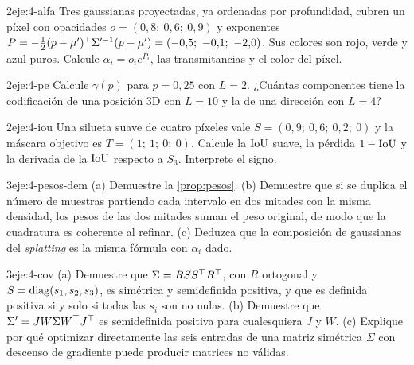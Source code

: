 \begin{ejercicio}{2}{eje:4-alfa}
Tres gaussianas proyectadas, ya ordenadas por profundidad, cubren un píxel con opacidades $o=(0{,}8;\ 0{,}6;\ 0{,}9)$ y exponentes $P=-\tfrac12(p-\mu')^\T\Sigma'^{-1}(p-\mu')=(-0{,}5;\ -0{,}1;\ -2{,}0)$. Sus colores son rojo, verde y azul puros. Calcule $\alpha_i=o_ie^{P_i}$, las transmitancias y el color del píxel.
\end{ejercicio}

\begin{ejercicio}{2}{eje:4-pe}
Calcule $\gamma(p)$ para $p=0{,}25$ con $L=2$. ¿Cuántas componentes tiene la codificación de una posición 3D con $L=10$ y la de una dirección con $L=4$?
\end{ejercicio}

\begin{ejercicio}{2}{eje:4-iou}
Una silueta suave de cuatro píxeles vale $S=(0{,}9;\ 0{,}6;\ 0{,}2;\ 0)$ y la máscara objetivo es $T=(1;\ 1;\ 0;\ 0)$. Calcule la $\operatorname{IoU}$ suave, la pérdida $1-\operatorname{IoU}$ y la derivada de la $\operatorname{IoU}$ respecto a $S_3$. Interprete el signo.
\end{ejercicio}

\begin{ejercicio}{3}{eje:4-pesos-dem}
(a) Demuestre la \cref{prop:pesos}. (b) Demuestre que si se duplica el número de muestras partiendo cada intervalo en dos mitades con la misma densidad, los pesos de las dos mitades suman el peso original, de modo que la cuadratura es coherente al refinar. (c) Deduzca que la composición de gaussianas del \emph{splatting} es la misma fórmula con $\alpha_i$ dado.
\end{ejercicio}

\begin{ejercicio}{3}{eje:4-cov}
(a) Demuestre que $\Sigma=RSS^\top R^\top$, con $R$ ortogonal y $S=\operatorname{diag}(s_1,s_2,s_3)$, es simétrica y semidefinida positiva, y que es definida positiva si y solo si todas las $s_i$ son no nulas. (b) Demuestre que $\Sigma'=JW\Sigma W^\top J^\top$ es semidefinida positiva para cualesquiera $J$ y $W$. (c) Explique por qué optimizar directamente las seis entradas de una matriz simétrica $\Sigma$ con descenso de gradiente puede producir matrices no válidas.
\end{ejercicio}

